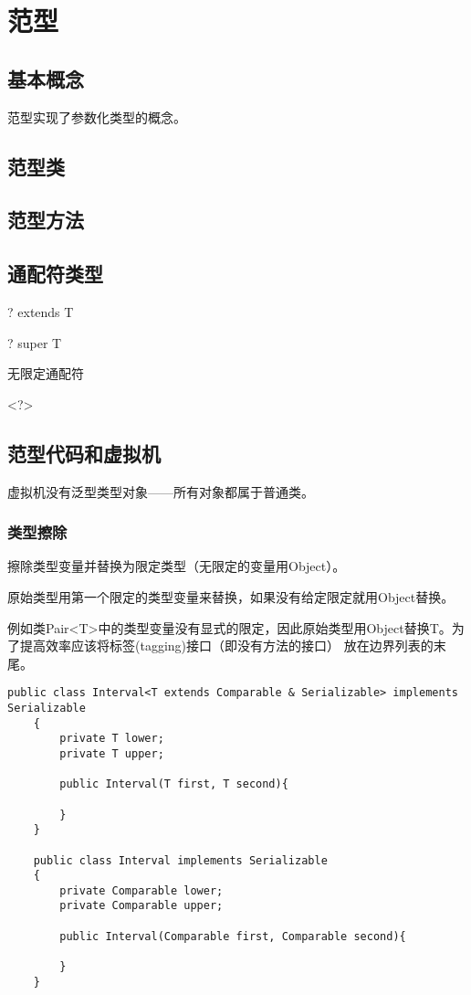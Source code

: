 \chapter{范型}

\label{chap:generics}

\section{基本概念}

范型实现了参数化类型的概念。

\section{范型类}


\section{范型方法}

\section{通配符类型}

? extends T 

? super T

无限定通配符

<?>



\section{范型代码和虚拟机}

虚拟机没有泛型类型对象——所有对象都属于普通类。

\subsection{类型擦除}
 
擦除类型变量并替换为限定类型（无限定的变量用Object）。

原始类型用第一个限定的类型变量来替换，如果没有给定限定就用Object替换。

例如类Pair<T>中的类型变量没有显式的限定，因此原始类型用Object替换T。为了提高效率应该将标签(tagging)接口（即没有方法的接口）
放在边界列表的末尾。

\begin{lstlisting}[style=cjava,label=useless]
    public class Interval<T extends Comparable & Serializable> implements Serializable
    {
        private T lower;
        private T upper;

        public Interval(T first, T second){

        }
    }

    public class Interval implements Serializable
    {
        private Comparable lower;
        private Comparable upper;

        public Interval(Comparable first, Comparable second){

        }
    }
\end{lstlisting}

